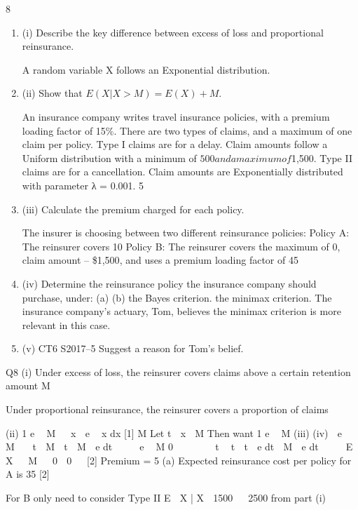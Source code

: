 \documentclass[a4paper,12pt]{article}
\begin{document}
8
\begin{enumerate}
\item (i)
Describe the key difference between excess of loss and proportional
reinsurance.

A random variable X follows an Exponential distribution.
\item (ii)
Show that $E ( X | X > M ) = E ( X ) + M $.

An insurance company writes travel insurance policies, with a premium loading factor of 15\%. There are two types of claims, and a maximum of one claim per policy.
Type I claims are for a delay. Claim amounts follow a Uniform distribution with a minimum of $500 and a maximum of $1,500.
Type II claims are for a cancellation. Claim amounts are Exponentially distributed with parameter λ = 0.001.
5%
\item (iii)
Calculate the premium charged for each policy.

The insurer is choosing between two different reinsurance policies:
Policy A: The reinsurer covers 10%
Policy B: The reinsurer covers the maximum of {0, claim amount – \$1,500}, and uses a premium loading factor of 45%
\item (iv)
Determine the reinsurance policy the insurance company should purchase, under:
(a)
(b)
the Bayes criterion.
the minimax criterion.
\medskip 
The insurance company’s actuary, Tom, believes the minimax criterion is more
relevant in this case.
\item (v)
CT6 S2017–5
Suggest a reason for Tom’s belief.
\end{enumerate}

\newpage

Q8
(i)
Under excess of loss, the reinsurer covers claims above a certain retention
amount M

Under proportional reinsurance, the reinsurer covers a proportion of claims \alpha

(ii)
1
e
 M

 x  e
 x
dx
[1]
M
Let t  x  M
Then want
1
e  M
(iii)
(iv)

e  M
  t  M 
t

M

e
dt

  
e  M
0





 t
 t 
t

e
dt

M

e
dt
 
  E  X   M

 0

0


[2]
Premium = 5%
(a)
Expected reinsurance cost per policy for A is
35%
[2]

For B only need to consider Type II
E  X | X  1500   2500 from part (i)
\end{document}
